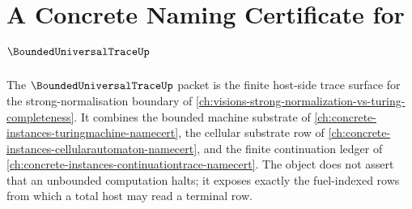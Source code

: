 \chapter{A Concrete Naming Certificate for $\BoundedUniversalTraceUp$}
\label{ch:concrete-instances-bounded-universal-trace-namecert}

The $\BoundedUniversalTraceUp$ packet is the finite host-side trace surface for the strong-normalisation boundary of \autoref{ch:visions-strong-normalization-vs-turing-completeness}. It combines the bounded machine substrate of \autoref{ch:concrete-instances-turingmachine-namecert}, the cellular substrate row of \autoref{ch:concrete-instances-cellularautomaton-namecert}, and the finite continuation ledger of \autoref{ch:concrete-instances-continuationtrace-namecert}. The object does not assert that an unbounded computation halts; it exposes exactly the fuel-indexed rows from which a total host may read a terminal row.



